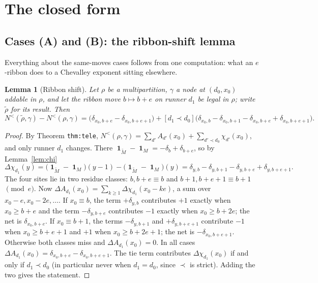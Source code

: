 \documentclass[11pt]{article}
\newtheorem{lemma}[theorem]{Lemma}
\theoremstyle{definition}
\theoremstyle{remark}
\newcommand{\Nlt}{N^{<}}
\DeclareMathOperator{\Ind}{\mathbf 1}
\begin{document}
\section{The closed form}\label{sec:closed}

\subsection{Cases (A) and (B): the ribbon-shift lemma}

Everything about the same-moves cases follows from one computation: what an $e$-ribbon
does to a Chevalley exponent sitting elsewhere.

\begin{lemma}[Ribbon shift]\label{lem:shift}
Let $\rho$ be a multipartition, $\gamma$ a node at $(d_0,x_0)$ addable in $\rho$, and let
the ribbon move $b\mapsto b+e$ on runner $d_1$ be legal in $\rho$; write $\tilde\rho$ for
its result. Then
\[
\Nlt(\tilde\rho,\gamma)-\Nlt(\rho,\gamma)
=\big(\delta_{x_0,b+e}-\delta_{x_0,b+e+1}\big)
+[d_1\prec d_0]\big(\delta_{x_0,b}-\delta_{x_0,b+1}-\delta_{x_0,b+e}+\delta_{x_0,b+e+1}\big).
\]
\end{lemma}

\begin{proof}
By Theorem \texttt{thm:tele},
$\Nlt(\rho,\gamma)=\sum_{d'}A_{d'}(x_0)+\sum_{d'\prec d_0}\chi_{d'}(x_0)$, and only
runner $d_1$ changes. There $\Ind_{\tilde M}-\Ind_{M}=-\delta_b+\delta_{b+e}$, so by
Lemma~\ref{lem:chi}
\[
\Delta\chi_{d_1}(y)=\big(\Ind_{\tilde M}-\Ind_M\big)(y-1)-\big(\Ind_{\tilde M}-\Ind_M\big)(y)
=\delta_{y,b}-\delta_{y,b+1}-\delta_{y,b+e}+\delta_{y,b+e+1}.
\]
The four sites lie in two residue classes: $b,b+e\equiv b$ and $b+1,b+e+1\equiv b+1$
$\pmod e$. Now
$\Delta A_{d_1}(x_0)=\sum_{k\ge1}\Delta\chi_{d_1}(x_0-ke)$, a sum over
$x_0-e,x_0-2e,\dots$. If $x_0\equiv b$, the term $+\delta_{y,b}$ contributes $+1$ exactly
when $x_0\ge b+e$ and the term $-\delta_{y,b+e}$ contributes $-1$ exactly when
$x_0\ge b+2e$; the net is $\delta_{x_0,b+e}$. If $x_0\equiv b+1$, the terms
$-\delta_{y,b+1}$ and $+\delta_{y,b+e+1}$ contribute $-1$ when $x_0\ge b+e+1$ and $+1$
when $x_0\ge b+2e+1$; the net is $-\delta_{x_0,b+e+1}$. Otherwise both classes miss and
$\Delta A_{d_1}(x_0)=0$. In all cases
$\Delta A_{d_1}(x_0)=\delta_{x_0,b+e}-\delta_{x_0,b+e+1}$. The tie term contributes
$\Delta\chi_{d_1}(x_0)$ if and only if $d_1\prec d_0$ (in particular never when
$d_1=d_0$, since $\prec$ is strict). Adding the two gives the statement.
\end{proof}
\end{document}
